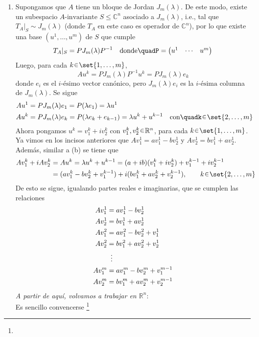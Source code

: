 \begin{sol}
\begin{enumerate}[leftmargin=*, label=(\alph*)]
\item Supongamos que $A$ tiene un bloque de Jordan $J_m(\lambda)$. De este modo, existe un subespacio $A\text{-invariante}$ $S \leq \mathbb{C}^n$ asociado a $J_m(\lambda)$, i.e., tal que $T_A|_S \sim J_m(\lambda)$ (donde $T_A$ en este caso es operador de $\mathbb{C}^n$), por lo que existe una base $(u^{1},\dots,u^{m})$ de $S$ que cumple
\[
T_A|_S = PJ_m(\lambda)P^{-1}%
\quad\text{donde}\quad%
P = \mqty(u^{1}&\cdots&u^{m})
\]
Luego, para cada $k \en \set{1,\dots,m}$,
\[
Au^{k}%
= PJ_m(\lambda)P^{-1}u^{k} = PJ_m(\lambda)e_k
\]
donde $e_i$ es el $i\text{-ésimo}$ vector canónico, pero $J_m(\lambda)e_i$ es la $i\text{-ésima}$ columna de $J_m(\lambda)$. Se sigue
\begin{align}
Au^{1} &= PJ_m(\lambda)e_1 = P(\lambda e_1) = \lambda u^{1}\\
Au^{k} &= PJ_m(\lambda)e_k = P(\lambda e_k + e_{k-1}) = \lambda u^{k} + u^{k-1}%
\quad\text{con}\quad%
k \en \set{2,\dots,m}
\end{align}
Ahora pongamos $u^{k} = v^k_1 + iv^k_2$ con $v^k_1,v^k_2 \en \mathbb{R}^n$, para cada $k \en \set{1,\dots,m}$. Ya vimos en los incisos anteriores que $Av^1_1 = av^1_1 - bv^1_2$ y $Av^1_2 = bv^1_1 + av^1_2$. Además, similar a (b) se tiene que
\begin{align*}
Av^k_1 + iAv^k_2 &= Au^k = \lambda u^{k} + u^{k-1} = (a + ib)(v^k_1 + iv^k_2) + v^{k-1}_1 + iv^{k-1}_2\\
&= (av^k_1 - bv^k_2 + v^{k-1}_1) + i(bv^k_1 + av^k_2 + v^{k-1}_2),%
\qquad k\en\set{2,\dots,m}
\end{align*}
De esto se sigue, igualando partes reales e imaginarias, que se cumplen las relaciones
\begin{equation}\label{eq:rel}
\begin{aligned}
Av^1_1 &= av^1_1 - bv^1_2\\
Av^1_2 &= bv^1_1 + av^1_2\\
Av^2_1 &= av^2_1 - bv^2_2 + v^{1}_1\\
Av^2_2 &= bv^2_1 + av^2_2 + v^{1}_2\\
       &\vdotswithin{=}\\
Av^m_1 &= av^m_1 - bv^m_2 + v^{m-1}_1\\
Av^m_2 &= bv^m_1 + av^m_2 + v^{m-1}_2
\end{aligned}
\end{equation}
\clearpage
\emph{A partir de aquí, volvamos a trabajar en $\mathbb{R}^n$}:\\
Es sencillo convencerse%
\footnote{%
}
\end{enumerate}
\end{sol}
